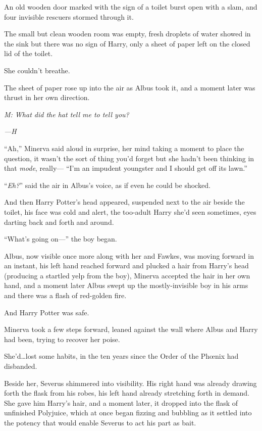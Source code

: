 An old wooden door marked with the sign of a toilet burst open with a slam, and four invisible rescuers stormed through it.

The small but clean wooden room was empty, fresh droplets of water showed in the sink but there was no sign of Harry, only a sheet of paper left on the closed lid of the toilet.

She couldn’t breathe.

The sheet of paper rose up into the air as Albus took it, and a moment later was thrust in her own direction.

\emph{M: What did the hat tell me to tell you?}

\emph{—H}

“Ah,” Minerva said aloud in surprise, her mind taking a moment to place the question, it wasn’t the sort of thing you’d forget but she hadn’t been thinking in that \emph{mode}, really— “I’m an impudent youngster and I should get off its lawn.”

“\emph{Eh?}” said the air in Albus’s voice, as if even he could be shocked.

And then Harry Potter’s head appeared, suspended next to the air beside the toilet, his face was cold and alert, the too-adult Harry she’d seen sometimes, eyes darting back and forth and around.

“What’s going on—” the boy began.

Albus, now visible once more along with her and Fawkes, was moving forward in an instant, his left hand reached forward and plucked a hair from Harry’s head (producing a startled yelp from the boy), Minerva accepted the hair in her own hand, and a moment later Albus swept up the mostly-invisible boy in his arms and there was a flash of red-golden fire.

And Harry Potter was safe.

Minerva took a few steps forward, leaned against the wall where Albus and Harry had been, trying to recover her poise.

She’d…lost some habits, in the ten years since the Order of the Phœnix had disbanded.

Beside her, Severus shimmered into visibility. His right hand was already drawing forth the flask from his robes, his left hand already stretching forth in demand. She gave him Harry’s hair, and a moment later, it dropped into the flask of unfinished Polyjuice, which at once began fizzing and bubbling as it settled into the potency that would enable Severus to act his part as bait.

